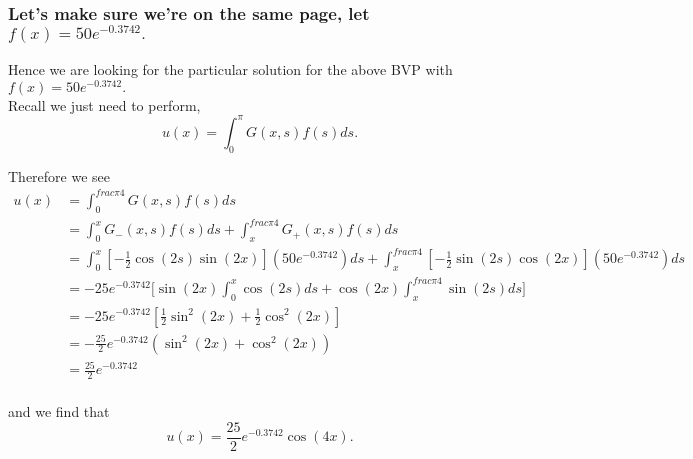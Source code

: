 \subsubsection{Let's make sure we're on the same page, let $f(x) = 50e^{-0.3742}.$}

Hence we are looking for the particular solution for the above BVP with $f(x) = 50e^{-0.3742}.$\\

Recall we just need to perform,
$$u(x) = \int_0^{\pi} G(x,s) f(s) ds.$$

Therefore we see
\begin{align}
u(x) &= \int_0^{frac{\pi}{4}} G(x,s) f(s) ds\\
&= \int_0^{x} G_{-}(x,s) f(s) ds + \int_x^{frac{\pi}{4}} G_{+}(x,s) f(s) ds\\
&=  \int_0^{x} \left[-\frac{1}{2} \cos(2s) \sin(2x)\right](50e^{-0.3742}) ds + \int_x^{frac{\pi}{4}} \left[-\frac{1}{2}\sin(2s) \cos(2x)  \right] (50e^{-0.3742}) ds\\
&= -25e^{-0.3742} \Bigg[ \sin(2x)  \int_0^{x}  \cos(2s) ds + \cos(2x) \int_x^{frac{\pi}{4}} \sin(2s) ds \Bigg]\\
&= -25e^{-0.3742} \left[ \frac{1}{2} \sin^2(2x) + \frac{1}{2}\cos^2(2x) \right] \\
&= -\frac{25}{2} e^{-0.3742} ( \sin^2(2x) + \cos^2(2x) )\\
&= \frac{25}{2} e^{-0.3742} \\
\end{align}

and we find that $$u(x) = \frac{25}{2} e^{-0.3742} \cos(4x) .$$